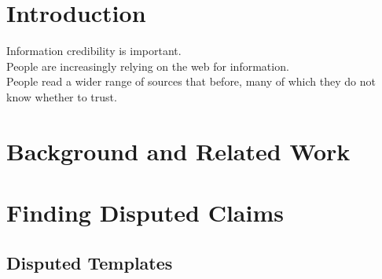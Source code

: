 \documentclass{www2010-submission}
\newcommand{\x}[1]{{\color{blue} #1}\\}
\begin{document}




\section{Introduction}

\x{Information credibility is important.}
\x{People are increasingly relying on the web for information.}
\x{People read a wider range of sources that before, many of which they do not know whether to trust.}

\section{Background and Related Work}




\section{Finding Disputed Claims}



\subsection{Disputed Templates}
\end{document}
